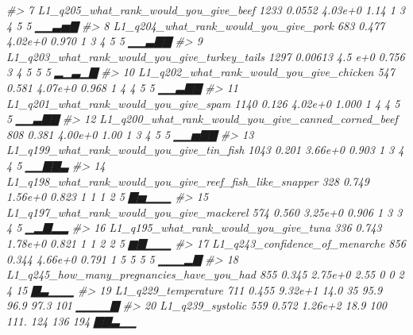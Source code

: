 \documentclass[]{article}
\newenvironment{Shaded}{\begin{snugshade}}{\end{snugshade}}
\newcommand{\CommentTok}[1]{\textcolor[rgb]{0.56,0.35,0.01}{\textit{#1}}}
\begin{document}
\begin{Shaded}
\begin{Highlighting}[]
\CommentTok{#>  7 L1_q205_what_rank_would_you_give_beef                        1233       0.0552  4.03e+0      1.14           1           3           4           5           5    ▁▁▃▅▇}
\CommentTok{#>  8 L1_q204_what_rank_would_you_give_pork                         683       0.477   4.02e+0      0.970          1           3           4           5           5    ▁▁▃▇▇}
\CommentTok{#>  9 L1_q203_what_rank_would_you_give_turkey_tails                1297       0.00613 4.5 e+0      0.756          3           4           5           5           5    ▂▁▃▁▇}
\CommentTok{#> 10 L1_q202_what_rank_would_you_give_chicken                      547       0.581   4.07e+0      0.968          1           4           4           5           5    ▁▁▃▇▇}
\CommentTok{#> 11 L1_q201_what_rank_would_you_give_spam                        1140       0.126   4.02e+0      1.000          1           4           4           5           5    ▁▁▃▇▇}
\CommentTok{#> 12 L1_q200_what_rank_would_you_give_canned_corned_beef           808       0.381   4.00e+0      1.00           1           3           4           5           5    ▁▁▅▇▇}
\CommentTok{#> 13 L1_q199_what_rank_would_you_give_tin_fish                    1043       0.201   3.66e+0      0.903          1           3           4           4           5    ▁▁▇▇▃}
\CommentTok{#> 14 L1_q198_what_rank_would_you_give_reef_fish_like_snapper       328       0.749   1.56e+0      0.823          1           1           1           2           5    ▇▅▁▁▁}
\CommentTok{#> 15 L1_q197_what_rank_would_you_give_mackerel                     574       0.560   3.25e+0      0.906          1           3           3           4           5    ▁▂▇▂▂}
\CommentTok{#> 16 L1_q195_what_rank_would_you_give_tuna                         336       0.743   1.78e+0      0.821          1           1           2           2           5    ▆▇▁▁▁}
\CommentTok{#> 17 L1_q243_confidence_of_menarche                                856       0.344   4.66e+0      0.791          1           5           5           5           5    ▁▁▁▂▇}
\CommentTok{#> 18 L1_q245_how_many_pregnancies_have_you_had                     855       0.345   2.75e+0      2.55           0           0           2           4          15    ▇▃▁▁▁}
\CommentTok{#> 19 L1_q229_temperature                                           711       0.455   9.32e+1     14.0           35          95.9        96.9        97.3       101    ▁▁▁▁▇}
\CommentTok{#> 20 L1_q239_systolic                                              559       0.572   1.26e+2     18.9          100         111.        124         136         194    ▇▇▃▁▁}

\end{Highlighting}
\end{Shaded}
\end{document}
